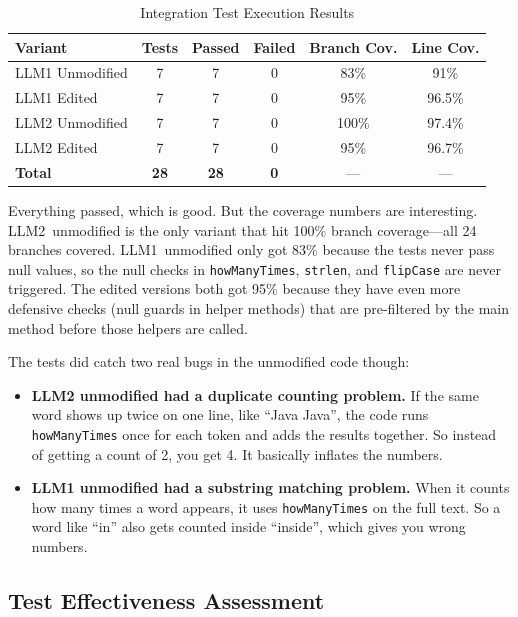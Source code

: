 \documentclass[12pt, a4paper]{article}
\begin{document}
\begin{table}[H]
\centering
\caption{Integration Test Execution Results}
\label{tab:integration-results}
\begin{tabularx}{\textwidth}{l c c c c c}
\toprule
\textbf{Variant} & \textbf{Tests} & \textbf{Passed} & \textbf{Failed} & \textbf{Branch Cov.} & \textbf{Line Cov.} \\
\midrule
LLM1 Unmodified & 7 & 7 & 0 & 83\%  & 91\% \\
LLM1 Edited     & 7 & 7 & 0 & 95\%  & 96.5\% \\
LLM2 Unmodified & 7 & 7 & 0 & 100\% & 97.4\% \\
LLM2 Edited     & 7 & 7 & 0 & 95\%  & 96.7\% \\
\midrule
\textbf{Total}  & \textbf{28} & \textbf{28} & \textbf{0} & --- & --- \\
\bottomrule
\end{tabularx}
\end{table}

Everything passed, which is good. But the coverage numbers are interesting. LLM2~unmodified is the only variant that hit 100\% branch coverage---all 24 branches covered. LLM1~unmodified only got 83\% because the tests never pass null values, so the null checks in \texttt{howManyTimes}, \texttt{strlen}, and \texttt{flipCase} are never triggered. The edited versions both got 95\% because they have even more defensive checks (null guards in helper methods) that are pre-filtered by the main method before those helpers are called.

The tests did catch two real bugs in the unmodified code though:
\begin{itemize}
    \item \textbf{LLM2 unmodified had a duplicate counting problem.} If the same word shows up twice on one line, like ``Java Java'', the code runs \texttt{howManyTimes} once for each token and adds the results together. So instead of getting a count of 2, you get 4. It basically inflates the numbers.
    \item \textbf{LLM1 unmodified had a substring matching problem.} When it counts how many times a word appears, it uses \texttt{howManyTimes} on the full text. So a word like ``in'' also gets counted inside ``inside'', which gives you wrong numbers.
\end{itemize}

\subsection{Test Effectiveness Assessment}
\end{document}
